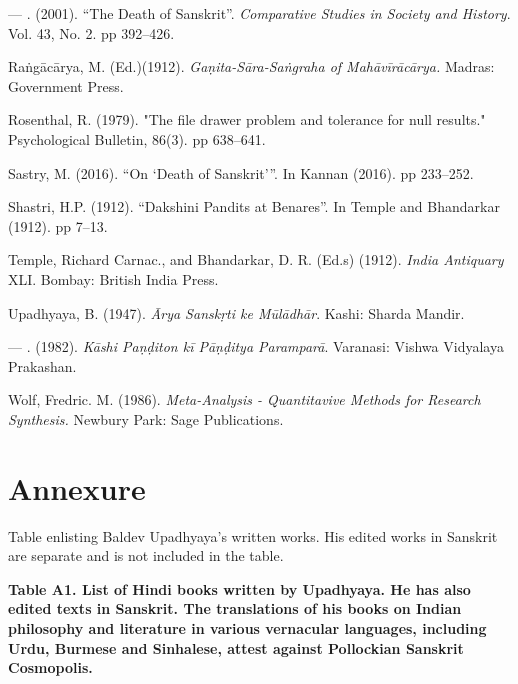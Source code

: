 \begin{thebibliography}{99}
  — . (2001). “The Death of Sanskrit”. \textit{Comparative Studies in Society and History}. Vol. 43, No. 2. pp 392--426.

  Raṅgācārya, M. (Ed.)(1912). \textit{Gaṇita-Sāra-Saṅgraha of Mahāvīrācārya.} Madras: Government Press.

  Rosenthal, R. (1979). "The file drawer problem and tolerance for null results." Psychological Bulletin, 86(3). pp 638--641.

  Sastry, M. (2016). “On ‘Death of Sanskrit’”. In Kannan (2016). pp 233--252.

  Shastri, H.P. (1912). “Dakshini Pandits at Benares”. In Temple and Bhandarkar (1912). pp 7--13.

  Temple, Richard Carnac., and Bhandarkar, D. R. (Ed.s) (1912). \textit{India Antiquary} XLI. Bombay: British India Press.

  Upadhyaya, B. (1947). \textit{Ārya Sanskṛti ke Mūlādhār}. Kashi: Sharda Mandir.

  — . (1982). \textit{Kāshi Paṇḍiton kī Pāṇḍitya Paramparā}. Varanasi: Vishwa Vidyalaya Prakashan.

  Wolf, Fredric. M. (1986). \textit{Meta-Analysis - Quantitavive Methods for Research Synthesis.} Newbury Park: Sage Publications.

 \end{thebibliography}


\section*{Annexure}

Table enlisting Baldev Upadhyaya’s written works. His edited works in Sanskrit are separate and is not included in the table.

\textbf{Table A1. List of Hindi books written by Upadhyaya. He has also edited texts in Sanskrit. The translations of his books on Indian philosophy and literature in various vernacular languages, including Urdu, Burmese and Sinhalese, attest against Pollockian Sanskrit Cosmopolis.}

